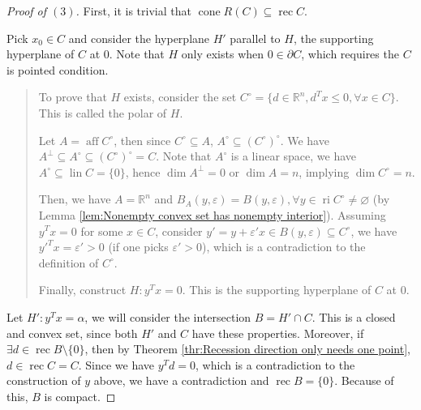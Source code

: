 \begin{proof}[Proof of \( (3) \)]
  First, it is trivial that \( \operatorname{cone} R(C) \subseteq
  \operatorname{rec} C \).

  Pick \( x_{0} \in C \) and consider the hyperplane \( H' \) parallel to \( H \),
  the supporting hyperplane of \( C \) at \( 0 \). Note that \( H \) only exists
  when \( 0 \in \partial C \), which requires the \( C \) is pointed condition.

  \begin{quote}
    To prove that \( H \) exists, consider the set \( C^{\circ} = \{d \in
    \mathbb{R}^{n}, d^{T}x \le  0, \forall x \in C\}   \). This is called the polar
    of \( H \).

    Let \( A = \operatorname{aff} C^{\circ} \), then since \( C^{\circ} \subseteq A \),
    \( A^{\circ} \subseteq (C^{\circ})^{\circ} \). We have \( A^{\perp } \subseteq
    A^{\circ} \subseteq (C^{\circ})^{\circ} = C \). Note that \( A^{\circ} \) is
    a linear space, we have \( A^{\circ} \subseteq \operatorname{lin} C = \{0\}
    \), hence \( \dim A^{\perp} = 0 \) or \( \dim A = n \), implying \( \dim
    C^{\circ} =
    n\).

    Then, we have \( A = \mathbb{R}^{n} \) and \( B_{A}(y, \varepsilon) = B(y,
    \varepsilon), \forall  y \in \operatorname{ri} C^{\circ} \neq \varnothing \)
    (by Lemma \ref{lem:Nonempty convex set has nonempty interior}). Assuming \(
    y^{T}x = 0\) for some \( x \in C \), consider \( y' = y + \varepsilon' x \in
    B(y, \varepsilon) \subseteq C^{\circ}\),
    we have \( y'^{T}x = \varepsilon' > 0 \) (if one picks
    \( \varepsilon' > 0 \)), which is a contradiction to the definition of \(
    C^{\circ} \).

    Finally, construct \( H: y^{T}x = 0 \). This is the supporting hyperplane of
    \( C \) at \( 0 \).
  \end{quote}

  Let \( H': y^{T}x = \alpha \), we will consider the intersection \( B = H' \cap
  C\). This is a closed and convex set, since both \( H' \) and \( C \) have
  these properties. Moreover, if \( \exists  d \in \operatorname{rec} B
  \setminus \{0\}   \), then by Theorem \ref{thr:Recession direction only needs
  one point}, \( d \in \operatorname{rec} C = C \). Since we have \( y^{T}d = 0
  \), which is a contradiction to the construction of \( y \) above, we have a
  contradiction and \( \operatorname{rec} B = \{0\}   \). Because of this, \( B
  \) is compact.


\end{proof}
